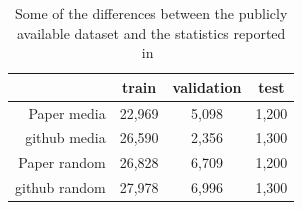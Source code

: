 

\begin{table}[]
   \centering
   \begin{tabular}{r|c|c|c}
       & train & validation & test \\
       \hline
       Paper media & 22,969 & 5,098 & 1,200 \\
       github media & 26,590 & 2,356 & 1,300 \\
       \hline
       Paper random & 26,828 & 6,709 & 1,200 \\
       github random & 27,978 & 6,996 & 1,300
   \end{tabular}
   \caption{Some of the differences between the publicly available dataset and the statistics reported in~\citet{baly2020we}}
   \label{tab:baly_size}
\end{table}



